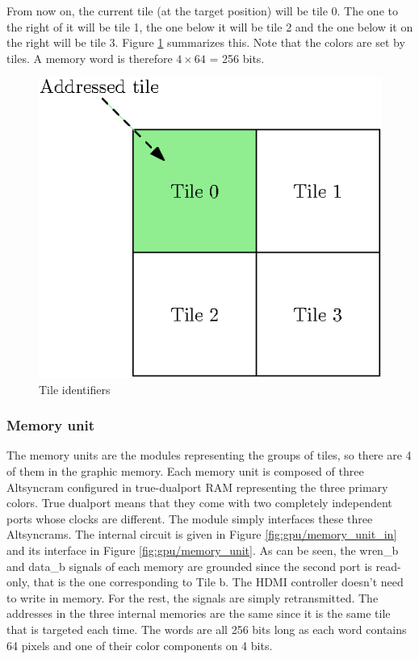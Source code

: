 From now on, the current tile (at the target position) will be tile 0. The one to the right of it
will be tile 1, the one below it will be tile 2 and the one below it on the right will be tile 3. 
Figure \ref{fig:gpu/tile_ids} summarizes this. Note that the colors are set by tiles. A memory word 
is therefore $4 \times 64$ = 256 bits.

\begin{figure}[H]
    \centering
    \includegraphics[scale=1.0]{Chapter4-GPU_CLKU/res/tile_ids}
    \caption{Tile identifiers}
    \label{fig:gpu/tile_ids}
\end{figure}

\subsubsection*{Memory unit}

The memory units are the modules representing the groups of tiles, so there are 4 of them in the 
graphic memory. Each memory unit is composed of three Altsyncram configured in true-dualport RAM 
representing the three primary colors. True dualport means that they come with two completely 
independent ports whose clocks are different. The module simply interfaces these three Altsyncrams. 
The internal circuit is given in Figure \ref{fig:gpu/memory_unit_in} and its interface in Figure 
\ref{fig:gpu/memory_unit}. As can be seen, the wren\_b and data\_b signals 
of each memory are grounded since the second port is read-only, that is the one corresponding to
Tile b. The HDMI controller doesn't need to write in memory. For the rest, the signals are 
simply retransmitted. The addresses in the three internal memories are the same since it is the
same tile that is targeted each time. The words are all 256 bits long as each word contains 64 
pixels and one of their color components on 4 bits. 

